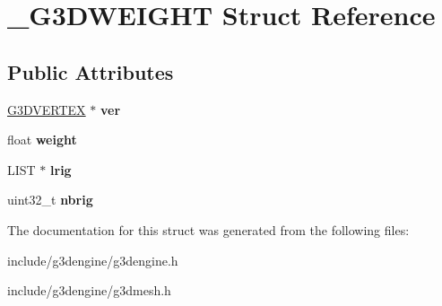 \hypertarget{struct__G3DWEIGHT}{}\section{\+\_\+\+G3\+D\+W\+E\+I\+G\+HT Struct Reference}
\label{struct__G3DWEIGHT}
\subsection*{Public Attributes}
\begin{DoxyCompactItemize}
\item 
\mbox{\label{struct__G3DWEIGHT_aff3250ffee45e3e0fbd96ada3f118c36}} 
\hyperlink{struct__G3DVERTEX}{G3\+D\+V\+E\+R\+T\+EX} $\ast$ {\bfseries ver}
\item 
\mbox{\label{struct__G3DWEIGHT_abca5f66798f028c160c1e810d417f4fd}} 
float {\bfseries weight}
\item 
\mbox{\label{struct__G3DWEIGHT_af9ee955dffc04a18bebba78512377ba6}} 
L\+I\+ST $\ast$ {\bfseries lrig}
\item 
\mbox{\label{struct__G3DWEIGHT_a42ce981924eb0959214c85e0eaa71949}} 
uint32\+\_\+t {\bfseries nbrig}
\end{DoxyCompactItemize}


The documentation for this struct was generated from the following files\+:\begin{DoxyCompactItemize}
\item 
include/g3dengine/g3dengine.\+h\item 
include/g3dengine/g3dmesh.\+h\end{DoxyCompactItemize}
